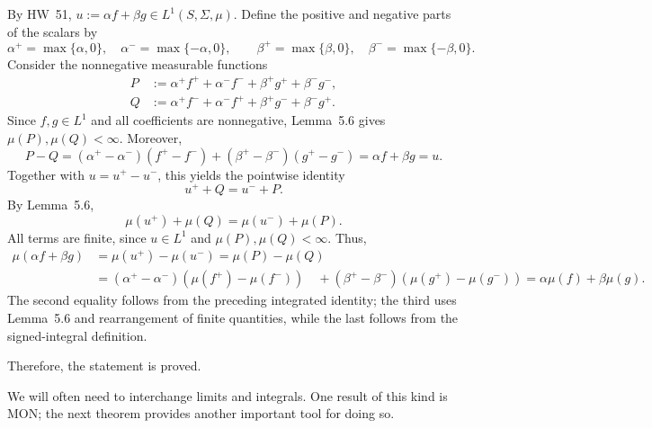 By HW~51, $u:=\alpha f+\beta g\in L^1(S,\Sigma,\mu)$. Define the positive and negative parts of the scalars by
\[
\alpha^+=\max\{\alpha,0\},\quad\alpha^-=\max\{-\alpha,0\},
\qquad
\beta^+=\max\{\beta,0\},\quad\beta^-=\max\{-\beta,0\}.
\]
Consider the nonnegative measurable functions
\[
\begin{aligned}
P&:=\alpha^+f^++\alpha^-f^-+\beta^+g^++\beta^-g^-,\\
Q&:=\alpha^+f^-+\alpha^-f^++\beta^+g^-+\beta^-g^+.
\end{aligned}
\]
Since $f,g\in L^1$ and all coefficients are nonnegative, Lemma~5.6 gives $\mu(P),\mu(Q)<\infty$. Moreover,
\[
P-Q=(\alpha^+-\alpha^-)(f^+-f^-)
+(\beta^+-\beta^-)(g^+-g^-)
=\alpha f+\beta g=u.
\]
Together with $u=u^+-u^-$, this yields the pointwise identity
\[
u^++Q=u^-+P.
\]
By Lemma~5.6,
\[
\mu(u^+)+\mu(Q)=\mu(u^-)+\mu(P).
\]
All terms are finite, since $u\in L^1$ and $\mu(P),\mu(Q)<\infty$. Thus,
\[
\begin{aligned}
\mu(\alpha f+\beta g)&=\mu(u^+)-\mu(u^-) =\mu(P)-\mu(Q)\\
&=(\alpha^+-\alpha^-)(\mu(f^+)-\mu(f^-)) \quad +(\beta^+-\beta^-)(\mu(g^+)-\mu(g^-)) =\alpha\mu(f)+\beta\mu(g).
\end{aligned}
\]
The second equality follows from the preceding integrated identity; the third uses Lemma~5.6 and rearrangement of finite quantities, while the last follows from the signed-integral definition.

Therefore, the statement is proved. 

We will often need to interchange limits and integrals. One result of this kind is MON; the next theorem provides another important tool for doing so.
